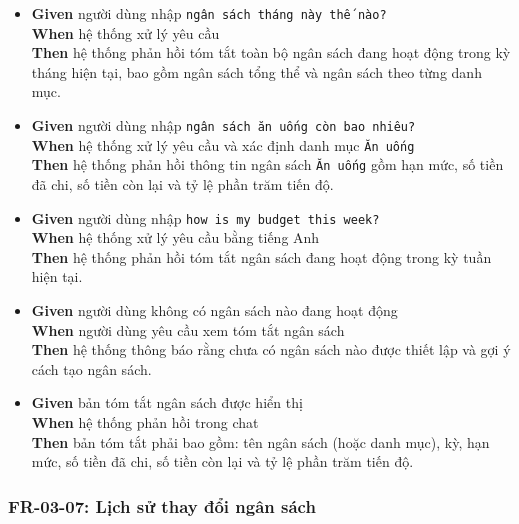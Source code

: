 \begin{itemize}
\item \textbf{Given} người dùng nhập \texttt{ngân sách tháng này thế nào?}  \\ \hspace*{1.5em}  \textbf{When} hệ thống xử lý yêu cầu  \\ \hspace*{1.5em}  \textbf{Then} hệ thống phản hồi tóm tắt toàn bộ ngân sách đang hoạt động trong kỳ tháng hiện tại, bao gồm ngân sách tổng thể và ngân sách theo từng danh mục.
\item \textbf{Given} người dùng nhập \texttt{ngân sách ăn uống còn bao nhiêu?}  \\ \hspace*{1.5em}  \textbf{When} hệ thống xử lý yêu cầu và xác định danh mục \texttt{Ăn uống}  \\ \hspace*{1.5em}  \textbf{Then} hệ thống phản hồi thông tin ngân sách \texttt{Ăn uống} gồm hạn mức, số tiền đã chi, số tiền còn lại và tỷ lệ phần trăm tiến độ.
\item \textbf{Given} người dùng nhập \texttt{how is my budget this week?}  \\ \hspace*{1.5em}  \textbf{When} hệ thống xử lý yêu cầu bằng tiếng Anh  \\ \hspace*{1.5em}  \textbf{Then} hệ thống phản hồi tóm tắt ngân sách đang hoạt động trong kỳ tuần hiện tại.
\item \textbf{Given} người dùng không có ngân sách nào đang hoạt động  \\ \hspace*{1.5em}  \textbf{When} người dùng yêu cầu xem tóm tắt ngân sách  \\ \hspace*{1.5em}  \textbf{Then} hệ thống thông báo rằng chưa có ngân sách nào được thiết lập và gợi ý cách tạo ngân sách.
\item \textbf{Given} bản tóm tắt ngân sách được hiển thị  \\ \hspace*{1.5em}  \textbf{When} hệ thống phản hồi trong chat  \\ \hspace*{1.5em}  \textbf{Then} bản tóm tắt phải bao gồm: tên ngân sách (hoặc danh mục), kỳ, hạn mức, số tiền đã chi, số tiền còn lại và tỷ lệ phần trăm tiến độ.
\end{itemize}
\subsubsection{FR-03-07: Lịch sử thay đổi ngân sách}

